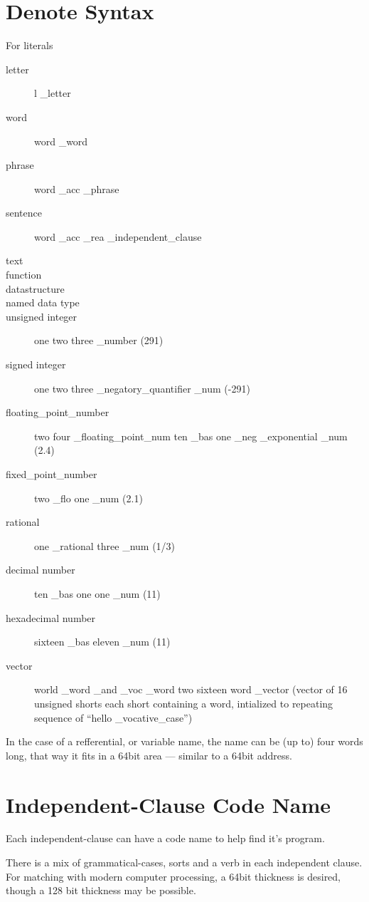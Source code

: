 \documentclass[12pt]{report}
\begin{document}
\section{Denote Syntax}
For literals
\begin{description}
  \item[letter] l \_letter
  \item[word] word \_word
  \item[phrase] word \_acc \_phrase
  \item[sentence] word \_acc \_rea \_independent\_clause
  \item[text] 
  \item[function]
  \item[datastructure]
  \item[named data type]
  \item[unsigned integer] one two three \_number (291)
  \item[signed integer] one two three \_negatory\_quantifier \_num
(-291)
  \item[floating\_point\_number] two four \_floating\_point\_num ten \_bas
one \_neg \_exponential \_num (2.4)
  \item[fixed\_point\_number] two \_flo one \_num (2.1)
  \item[rational] one \_rational three \_num (1/3)
  \item[decimal number] ten \_bas  one one \_num (11)
  \item[hexadecimal number] sixteen \_bas eleven \_num (11)
  \item[vector] world \_word \_and \_voc \_word two sixteen word \_vector (vector of 16
unsigned shorts each short containing a word, intialized to repeating sequence
of ``hello \_vocative\_case'')
\end{description}

In the case of a refferential, or variable name, the name can be (up to) four
words long, that way it fits in a 64bit area --- similar to a 64bit address.

\section{Independent-Clause Code Name}

Each independent-clause can have a code name to help find it's program.

There is a mix of grammatical-cases, sorts and a verb in each independent clause. 
For matching with modern computer processing, a 64bit thickness is desired,
though a 128 bit thickness may be possible.\ 
\end{document}
